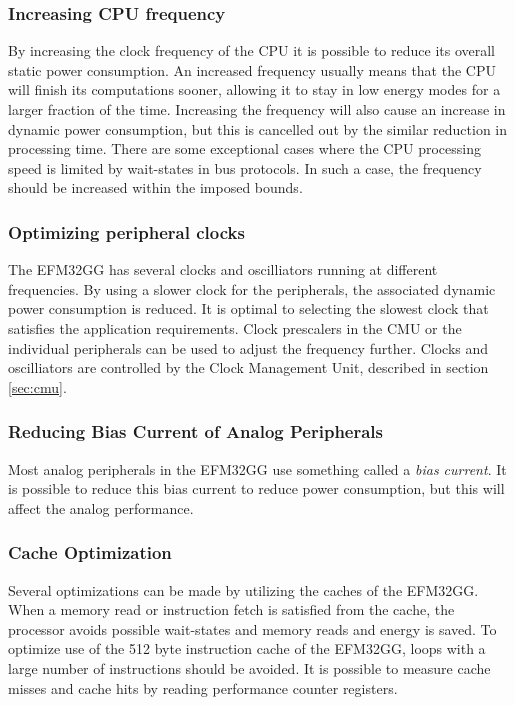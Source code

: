 \subsubsection{Increasing CPU frequency}
By increasing the clock frequency of the CPU it is possible to reduce its overall static power consumption. An increased frequency usually means that the CPU will finish its computations sooner, allowing it to stay in low energy modes for a larger fraction of the time. Increasing the frequency will also cause an increase in dynamic power consumption, but this is cancelled out by the similar reduction in processing time. There are some exceptional cases where the CPU processing speed is limited by wait-states in bus protocols. In such a case, the frequency should be increased within the imposed bounds.\cite{efm32-energy-optimization}


\subsubsection{Optimizing peripheral clocks}
The EFM32GG has several clocks and oscilliators running at different frequencies. By using a slower clock for the peripherals, the associated dynamic power consumption is reduced. It is optimal to selecting the slowest clock that satisfies the application requirements. Clock prescalers in the CMU or the individual peripherals can be used to adjust the frequency further. Clocks and oscilliators are controlled by the Clock Management Unit, described in section \ref{sec:cmu}.\cite{efm32-energy-optimization} 


\subsubsection{Reducing Bias Current of Analog Peripherals}
Most analog peripherals in the EFM32GG use something called a \emph{bias current}. It is possible to reduce this bias current to reduce power consumption, but this will affect the analog performance.\cite{efm32-energy-optimization}


\subsubsection{Cache Optimization}
Several optimizations can be made by utilizing the caches of the EFM32GG. When a memory read or instruction fetch is satisfied from the cache, the processor avoids possible wait-states and memory reads and energy is saved. To optimize use of the 512 byte instruction cache of the EFM32GG, loops with a large number of instructions should be avoided. It is possible to measure cache misses and cache hits by reading performance counter registers.\cite{efm32-energy-optimization}


